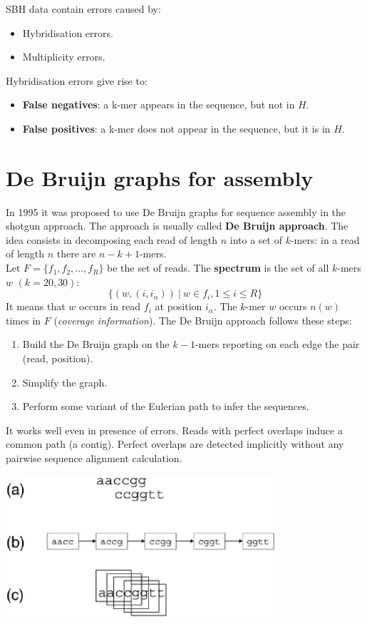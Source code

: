 SBH data contain errors caused by:
\begin{itemize}
	\item Hybridisation errors.
	\item Multiplicity errors.
\end{itemize}
Hybridisation errors give rise to:
\begin{itemize}
	\item \textbf{False negatives}: a k-mer appears in the sequence, but not in $H$.
	\item \textbf{False positives}: a k-mer does not appear in the sequence, but it is in $H$.
\end{itemize}

\section{De Bruijn graphs for assembly}
In 1995 it was proposed to use De Bruijn graphs for sequence assembly in the shotgun approach. The approach is usually called \textbf{De Bruijn approach}. The idea consists in decomposing each read of length $n$ into a set of $k$-mers: in a read of length $n$ there are $n-k+1$-mers.\\
Let $F=\{f_1, f_2, \dots, f_R\}$ be the set of reads. The \textbf{spectrum} is the set of all $k$-mers $w$ $(k=20,30)$:
$$\{(w,(i,i_{\alpha})) ~|~ w \in f_i, 1 \leq i \leq R\}$$
It means that $w$ occurs in read $f_i$ at position $i_{\alpha}$. The $k$-mer $w$ occurs $n(w)$ times in $F$ (\textit{coverage information}).
The De Bruijn approach follows these steps:
\begin{enumerate}
	\item Build the De Bruijn graph on the $k-1$-mers reporting on each edge the pair (read, position).
	\item Simplify the graph.
	\item Perform some variant of the Eulerian path to infer the sequences.
\end{enumerate}
It works well even in presence of errors. Reads with perfect overlaps induce a common path (a contig). Perfect overlaps are detected implicitly without any pairwise sequence alignment calculation.
\begin{center}
	\includegraphics[width=0.7\columnwidth]{img/DeBruijn3}
\end{center} 
